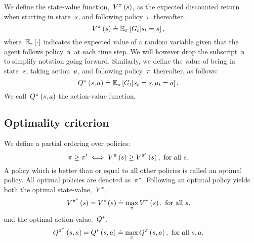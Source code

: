 We define the state-value function,~${\statevalue\policyscript\left(\state\right)}$, as the expected discounted return when starting in state~${\state}$, and following policy~${\pi}$ thereafter,
\begin{equation} \label{eq:state_value}
    \statevalue\policyscript\left(\state\right)\doteq\mathbb{E}_{\policy}\left[\return_{\timestep}\middle\vert\randomstate_{\timestep}=\state\right],
\end{equation}
where~${\mathbb{E}_{\pi}\left[\cdot\right]}$ indicates the expected value of a random variable given that the agent follows policy~${\pi}$ at each time step. We will however drop the subscript~${\pi}$ to simplify notation going forward. Similarly, we define the value of being in state~${\state}$, taking action~${\action}$, and following policy~${\pi}$ thereafter, as follows:
\begin{equation} \label{eq:action_value}
    \actionvalue\policyscript\left(\state,\action\right)\doteq\mathbb{E}_{\policy}\left[\return_{\timestep}\middle\vert\randomstate_{\timestep}=\state,\randomaction_{\timestep}=\action\right].
\end{equation}
We call~${\actionvalue\policyscript\left(\state,\action\right)}$ the action-value function.

\subsection{Optimality criterion}
We define a partial ordering over policies:
\begin{equation}
    \policy\geq\policy'\iff\statevalue\policyscript\left(\state\right)\geq\statevalue\script{\policy'}\left(\state\right),~\textnormal{for all}~\state.
\end{equation}
A policy which is better than or equal to all other policies is called an optimal policy. All optimal policies are denoted as~$\pi^{*}$. Following an optimal policy yields both the optimal state-value,~${V^{*}}$,
\begin{equation} \label{eq:optimal_state_value}
    \statevalue\script{\policy\optimal}\left(\state\right)=\statevalue\optimal\left(\state\right)\doteq\max_{\policy}\statevalue\policyscript\left(\state\right),~\textnormal{for all}~\state,
\end{equation}
and the optimal action-value,~${Q^{*}}$,
\begin{equation}
    \actionvalue\script{\policy\optimal}\left(\state,\action\right)=\actionvalue\optimal\left(\state,\action\right)\doteq\max_{\policy}\actionvalue\policyscript\left(\state,\action\right),~\textnormal{for all}~\state,\action.
\end{equation}

